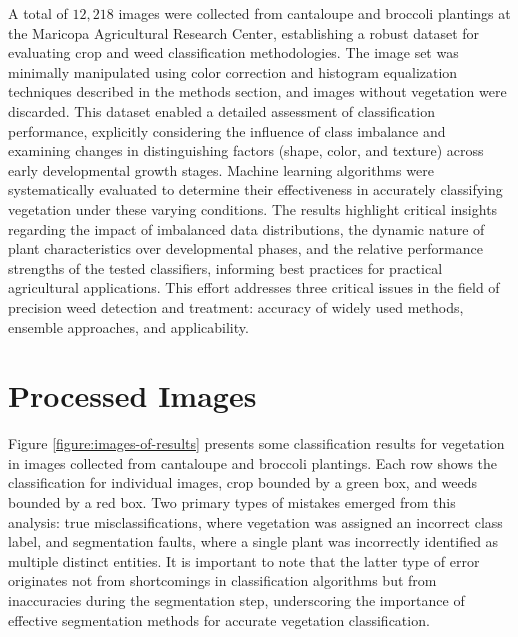 \documentclass[letterpaper, notitlepage]{report}
\begin{document}
A total of $12,218$ images were collected from cantaloupe and broccoli plantings at the Maricopa Agricultural Research Center, establishing a robust dataset for evaluating crop and weed classification methodologies. The image set was minimally manipulated using color correction and histogram equalization techniques described in the methods section, and images without vegetation were discarded. This dataset enabled a detailed assessment of classification performance, explicitly considering the influence of class imbalance and examining changes in distinguishing factors (shape, color, and texture) across early developmental growth stages. Machine learning algorithms were systematically evaluated to determine their effectiveness in accurately classifying vegetation under these varying conditions. The results highlight critical insights regarding the impact of imbalanced data distributions, the dynamic nature of plant characteristics over developmental phases, and the relative performance strengths of the tested classifiers, informing best practices for practical agricultural applications. This effort addresses three critical issues in the field of precision weed detection and treatment: accuracy of widely used methods, ensemble approaches, and applicability.

\section{Processed Images}
Figure \ref{figure:images-of-results} presents  some classification results for vegetation in images collected from cantaloupe and broccoli plantings. Each row shows the classification for individual images, crop bounded by a green box, and weeds bounded by a red box. Two primary types of mistakes emerged from this analysis: true misclassifications, where vegetation was assigned an incorrect class label, and segmentation faults, where a single plant was incorrectly identified as multiple distinct entities. It is important to note that the latter type of error originates not from shortcomings in classification algorithms but from inaccuracies during the segmentation step, underscoring the importance of effective segmentation methods for accurate vegetation classification.
\end{document}
